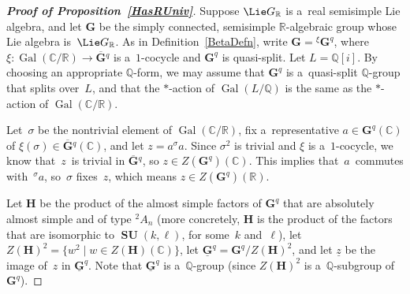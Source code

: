 \documentclass[pdftex]{sigma}
\DeclareMathOperator{\Gal}{Gal}
\DeclareMathOperator{\SU}{\mathbf{SU}}
\numberwithin{equation}{section}
\begin{document}
\begin{proof}[\bf Proof of Proposition~\ref{HasRUniv}] Suppose $\Lie G_\mathbb{R}$ is a~real semisimple Lie algebra, and let $\mathbf{G}$ be the
simply connected, semisimple $\mathbb{R}$-algebraic group whose Lie algebra is~$\Lie G_\mathbb{R}$.
As in Def\/inition~\ref{BetaDefn}, write $\mathbf{G} = {}^\xi \mathbf{G}^q$, where $\xi \colon \Gal(\mathbb{C}/\mathbb{R}) \to
\overline{\mathbf{G}}{}^q$ is a~$1$-cocycle and $\mathbf{G}^q$ is quasi-split.
Let $L = \mathbb{Q}[i]$.
By choosing an appropriate $\mathbb{Q}$-form, we may assume that $\mathbf{G}^q$ is a~quasi-split $\mathbb{Q}$-group that
splits over~$L$, and that the $*$-action of $\Gal(L/\mathbb{Q})$ is the same as the $*$-action of
$\Gal(\mathbb{C}/\mathbb{R})$.

Let~$\sigma$ be the nontrivial element of $\Gal(\mathbb{C}/\mathbb{R})$, f\/ix a~representative $a \in
\mathbf{G}^q(\mathbb{C})$ of $\xi(\sigma) \in \overline{\mathbf{G}}{}^q(\mathbb{C})$, and let $z = a {}^\sigma a$.
Since $\sigma^2$ is trivial and $\xi$ is a~$1$-cocycle, we know that~$z$~is trivial in $\overline{\mathbf{G}}{}^q$, so $z
\in Z(\mathbf{G}^q)(\mathbb{C})$.
This implies that~$a$~commutes with~${}^\sigma a$, so~$\sigma$ f\/ixes~$z$, which means $z \in
Z(\mathbf{G}^q)(\mathbb{R})$.

Let $\mathbf{H}$ be the product of the almost simple factors of $\mathbf{G}^q$ that are absolutely almost simple and of
type ${}^{2} A_n$ (more concretely, $\mathbf{H}$ is the product of the factors that are isomorphic to $\SU(k,\ell)$, for
some~$k$ and~$\ell$), let $Z(\mathbf{H})^2 = \{ w^2 \mid w \in Z(\mathbf{H})(\mathbb{C}) \}$, let
$\underline{\mathbf{G}}^q = \mathbf{G}^q/Z(\mathbf{H})^2$, and let $\underline z$ be the image of~$z$ in
$\underline{\mathbf{G}}^q$.
Note that $\underline{\mathbf{G}}^q$ is a~$\mathbb{Q}$-group (since $Z(\mathbf{H})^2$ is a~$\mathbb{Q}$-subgroup
of~$\mathbf{G}^q$).


\end{proof}
\end{document}

